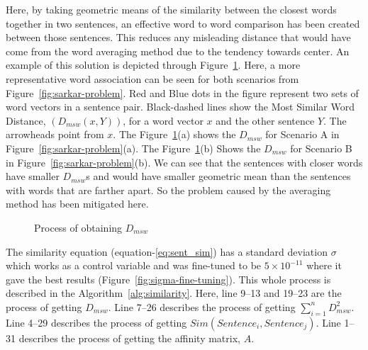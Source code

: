 Here, by taking geometric means of the similarity between the closest words together in two sentences,
an effective word to word comparison has been created between those sentences.
This reduces any misleading distance that would have come from the word averaging method due to
the tendency towards center.
An example of this solution is depicted through Figure~\ref{fig:msd}.
Here, a more representative word association can be seen for both scenarios from Figure~\ref{fig:sarkar-problem}.
Red and Blue dots in the figure represent two sets of word vectors in a sentence pair.
Black-dashed lines show the Most Similar Word Distance, $(D_{msw}(x,Y))$,
for a word vector $x$ and the other sentence $Y$.
The arrowheads point from $x$.
The Figure~\ref{fig:msd}(a) shows the $D_{msw}$ for Scenario A in Figure~\ref{fig:sarkar-problem}(a).
The Figure~\ref{fig:msd}(b) Shows the $D_{msw}$ for Scenario B in Figure~\ref{fig:sarkar-problem}(b).
We can see that the sentences with closer words have smaller $D_{msw}$s and would have smaller geometric mean
than the sentences with words that are farther apart.
So the problem caused by the averaging method has been mitigated here.\\

\begin{figure}
    \centering
    
    \caption{Process of obtaining $D_{msw}$}
    \label{fig:msd}
\end{figure}

The similarity equation (equation-\ref{eq:sent_sim}) has a standard deviation $\sigma$ which works
as a control variable and was fine-tuned to be $5\times10^{-11}$ where
it gave the best results (Figure~\ref{fig:sigma-fine-tuning}).
This whole process is described in the Algorithm~\ref{alg:similarity}.
Here, line 9--13 and 19--23 are the process of getting $D_{msw}$.
Line 7--26 describes the process of getting $\sum^n_{i=1}D_{msw}^2$.
Line 4--29 describes the process of getting $Sim(Sentence_i,Sentence_j)$.
Line 1--31 describes the process of getting the affinity matrix, $A$.

